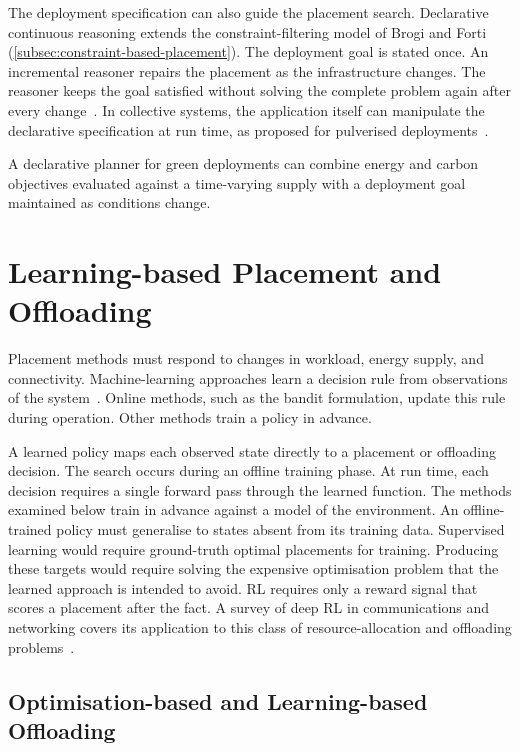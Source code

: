 The deployment specification can also guide the placement search.
%
Declarative continuous reasoning extends the constraint-filtering model of Brogi and Forti (\cref{subsec:constraint-based-placement}).
The deployment goal is stated once.
An incremental reasoner repairs the placement as the infrastructure changes.
The reasoner keeps the goal satisfied without solving the complete problem again after every change~\cite{DBLP:journals/logcom/FortiBB22}.
%
In collective systems, the application itself can manipulate the declarative specification at run time, as proposed for pulverised deployments~\cite{DBLP:journals/fgcs/FarabegoliPCV24}.

A declarative planner for green deployments can combine energy and carbon objectives evaluated against a time-varying supply
with a deployment goal maintained as conditions change.

\section{Learning-based Placement and Offloading}
\label{sec:ml-for-topologies}

Placement methods must respond to changes in workload, energy supply, and connectivity.
Machine-learning approaches learn a decision rule from observations of the system~\cite{DBLP:journals/csur/Ait-SalahtDL20,DBLP:journals/csur/TalebGD25}.
Online methods, such as the bandit formulation, update this rule during operation.
Other methods train a policy in advance.

A learned policy maps each observed state directly to a placement or offloading decision.
%
The search occurs during an offline training phase.
At run time, each decision requires a single forward pass through the learned function.
%
The methods examined below train in advance against a model of the environment.
%
An offline-trained policy must generalise to states absent from its training data.
%
Supervised learning would require ground-truth optimal placements for training.
Producing these targets would require solving the expensive optimisation problem that the learned approach is intended to avoid.
%
\ac{RL} requires only a reward signal that scores a placement after the fact.
%
A survey of deep \ac{RL} in communications and networking covers its application to this class of resource-allocation and offloading problems~\cite{DBLP:journals/comsur/LuongHGNWLK19}.

\subsection{Optimisation-based and Learning-based Offloading}
\label{subsec:learning-based-offloading}

